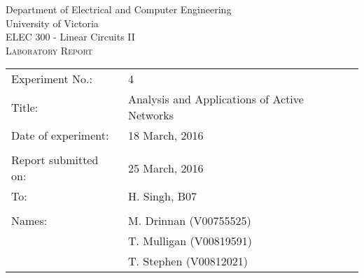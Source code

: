 \begin{titlepage}

\begin{center}
	\begin{LARGE}
		Department of Electrical and Computer Engineering \\
		University of Victoria \\
		ELEC 300 - Linear Circuits II \\[1cm]
		\textsc{Laboratory Report}
		\\[1cm]
	\end{LARGE}
\end{center}

\begin{tabular}{ p{} p{} }
	Experiment No.: & 4 \\ 
	Title: & Analysis and Applications of Active Networks \\ 
	Date of experiment:& 18 March, 2016 \\ 
	& \\
	Report submitted on:& 25 March, 2016 \\ 
	To: & H. Singh, B07 \\ 
	& \\
	Names: & M. Drinnan (V00755525)\\
	& T. Mulligan (V00819591) \\
	& T. Stephen (V00812021)  
\end{tabular}

\end{titlepage}
